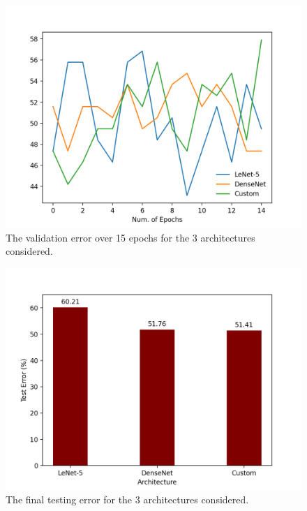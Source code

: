 \documentclass[manuscript,screen,review]{acmart}
\begin{document}
\begin{figure}[h]
  \centering
  \includegraphics[width=\linewidth]{../presentation/validation_error.png}
  \caption{The validation error over 15 epochs for the 3 architectures considered.}
  \label{fig:valid}
\end{figure}






\begin{figure}[h]
  \centering
  \includegraphics[width=\linewidth]{../presentation/finaltest_error.png}
  \caption{The final testing error for the 3 architectures considered.}
  \label{fig:test}
\end{figure}
\end{document}
